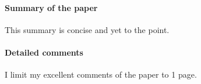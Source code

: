 \documentclass{article}
\begin{document}
\thispagestyle{empty}

\paragraph{Summary of the paper}
This summary is concise and yet to the point.

\paragraph{Detailed comments}
I limit my excellent comments of the paper to 1 page.


\newpage



\end{document}
